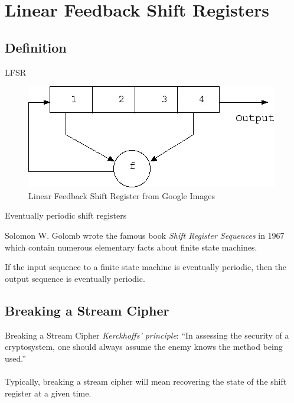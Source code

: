 \documentclass{beamer}
\begin{document}
\section{Linear Feedback Shift Registers}
\subsection{Definition}
\begin{frame}{LFSR}
  \begin{figure}[h!]
    \centering
    \includegraphics[totalheight=0.5\textheight]{lfsr.jpg}
    \caption{Linear Feedback Shift Register from Google Images}
  \end{figure}
\end{frame}

\begin{frame}{Eventually periodic shift registers}
  \par Solomon W. Golomb wrote the famous book \textit{Shift Register
  Sequences} in 1967 which contain numerous elementary facts about finite
  state machines.
  \begin{theorem}\label{thm:golomb-2}
    If the input sequence to a finite state machine is eventually periodic, then
    the output sequence is eventually periodic.
  \end{theorem}
\end{frame}

\subsection{Breaking a Stream Cipher}
\begin{frame}{Breaking a Stream Cipher}
  \textit{Kerckhoffs' principle}: ``In assessing the security of a
  cryptosystem, one should always assume the enemy knows the method being
  used.''\\
  \ \\
  Typically, breaking a stream cipher will mean recovering the state of
  the shift register at a given time.
\end{frame}
\end{document}
